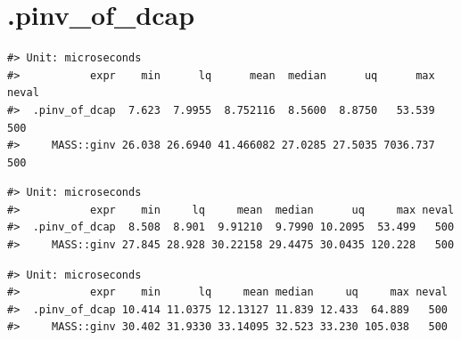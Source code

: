 \documentclass{article}\usepackage[]{graphicx}\usepackage[]{color}
\makeatletter
\newenvironment{kframe}{%
 \def\at@end@of@kframe{}%
 \ifinner\ifhmode%
  \def\at@end@of@kframe{\end{minipage}}%
  \begin{minipage}{\columnwidth}%
 \fi\fi%
 \def\FrameCommand##1{\hskip\@totalleftmargin \hskip-\fboxsep
 \colorbox{shadecolor}{##1}\hskip-\fboxsep
     \hskip-\linewidth \hskip-\@totalleftmargin \hskip\columnwidth}%
 \MakeFramed {\advance\hsize-\width
   \@totalleftmargin\z@ \linewidth\hsize
   \@setminipage}}%
 {\par\unskip\endMakeFramed%
 \at@end@of@kframe}
\newenvironment{knitrout}{}{} %
\makeatother
\begin{document}
\newpage

\section{.pinv\_of\_dcap}



\begin{knitrout}
\color{fgcolor}\begin{kframe}
\begin{verbatim}
#> Unit: microseconds
#>           expr    min      lq      mean  median      uq      max neval
#>  .pinv_of_dcap  7.623  7.9955  8.752116  8.5600  8.8750   53.539   500
#>     MASS::ginv 26.038 26.6940 41.466082 27.0285 27.5035 7036.737   500
\end{verbatim}


{\ttfamily\noindent\itshape\color{messagecolor}{\#> Coordinate system already present. Adding new coordinate system, which will replace the existing one.}}\begin{verbatim}
#> Unit: microseconds
#>           expr    min     lq     mean  median      uq     max neval
#>  .pinv_of_dcap  8.508  8.901  9.91210  9.7990 10.2095  53.499   500
#>     MASS::ginv 27.845 28.928 30.22158 29.4475 30.0435 120.228   500
\end{verbatim}


{\ttfamily\noindent\itshape\color{messagecolor}{\#> Coordinate system already present. Adding new coordinate system, which will replace the existing one.}}\begin{verbatim}
#> Unit: microseconds
#>           expr    min      lq     mean median     uq     max neval
#>  .pinv_of_dcap 10.414 11.0375 12.13127 11.839 12.433  64.889   500
#>     MASS::ginv 30.402 31.9330 33.14095 32.523 33.230 105.038   500
\end{verbatim}



\end{kframe}
\end{knitrout}
\end{document}
